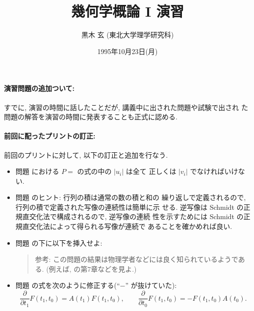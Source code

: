 \documentclass[12pt,twoside]{jarticle}
\def\pd#1#2{\frac{\partial #1}{\partial #2}}
\begin{document}

\title{\bf 幾何学概論 I 演習}

\author{黒木 玄 \quad (東北大学理学研究科)}

\date{1995年10月23日(月)}

\maketitle



\paragraph{演習問題の追加ついて:}

すでに, 演習の時間に話したことだが, 講義中に出された問題や試験で出され
た問題の解答を演習の時間に発表することも正式に認める.


\paragraph{前回に配ったプリントの訂正:}

前回のプリントに対して, 以下の訂正と追加を行なう.
\begin{itemize}
\item 問題  における $P=$ の式の中の $|u_i|$ は全て
  正しくは $|v_i|$ でなければいけない.
\item 問題  のヒント: 行列の積は通常の数の積と和の
  繰り返しで定義されるので, 行列の積で定義された写像の連続性は簡単に示
  せる. 逆写像は Schmidt の正規直交化法で構成されるので, 逆写像の連続
  性を示すためには Schmidt の正規直交化法によって得られる写像が連続で
  あることを確かめれば良い.
\item 問題  の下に以下を挿入せよ:
  \begin{quote}
    参考: この問題の結果は物理学者などには良く知られているようである. 
    (例えば, \cite{Polyakov}{} の第7章などを見よ.)
  \end{quote}
\item 問題  の式を次のように修正する(``$-$'' が抜けていた):
  \[
    \pd{}{t_1} F(t_1,t_0) = A(t_1) F(t_1,t_0),
    \qquad
    \pd{}{t_0} F(t_1,t_0) = - F(t_1,t_0) A(t_0).
  \]
\end{itemize}
\end{document}
